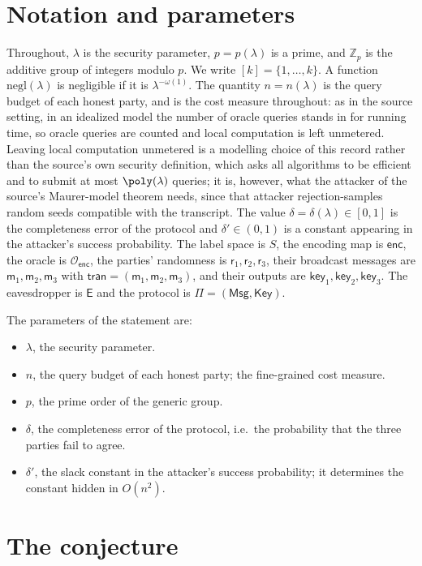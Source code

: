 \documentclass{conjura-conjecture}
\newcommand{\Zp}{\mathbb{Z}_{p}}
\newcommand{\enc}{\mathsf{enc}}
\newcommand{\Oenc}{\mathcal{O}_{\enc}}
\newcommand{\Msg}{\mathsf{Msg}}
\newcommand{\Key}{\mathsf{Key}}
\newcommand{\tran}{\mathsf{tran}}
\newcommand{\keyv}{\mathsf{key}}
\newcommand{\rv}{\mathsf{r}}
\newcommand{\mv}{\mathsf{m}}
\newcommand{\Ev}{\mathsf{E}}
\newcommand{\negl}{\mathrm{negl}}
\begin{document}
\section{Notation and parameters}\label{sec:notation}

Throughout, $\lambda$ is the security parameter, $p = p(\lambda)$ is a
prime, and $\Zp$ is the additive group of integers modulo $p$. We write
$[k] = \{1,\dots,k\}$. A function $\negl(\lambda)$ is negligible if it
is $\lambda^{-\omega(1)}$. The quantity $n = n(\lambda)$ is the query
budget of each honest party, and is the cost measure throughout: as in
the source setting, in an idealized model the number of oracle queries
stands in for running time, so oracle queries are counted and local
computation is left unmetered. Leaving local computation unmetered is a
modelling choice of this record rather than the source's own security
definition, which asks all algorithms to be efficient and to submit at
most $\poly(\lambda)$ queries; it is, however, what the attacker of the
source's Maurer-model theorem needs, since that attacker
rejection-samples random seeds compatible with the transcript. The value
$\delta = \delta(\lambda) \in [0,1]$ is the completeness error of the
protocol and $\delta' \in (0,1)$ is a constant appearing in the
attacker's success probability. The label space is $S$, the encoding map
is $\enc$, the oracle is $\Oenc$, the parties' randomness is
$\rv_{1},\rv_{2},\rv_{3}$, their broadcast messages are
$\mv_{1},\mv_{2},\mv_{3}$ with $\tran = (\mv_{1},\mv_{2},\mv_{3})$, and
their outputs are $\keyv_{1},\keyv_{2},\keyv_{3}$. The eavesdropper is
$\Ev$ and the protocol is $\Pi = (\Msg,\Key)$.

The parameters of the statement are:
\begin{itemize}
\item $\lambda$, the security parameter.
\item $n$, the query budget of each honest party; the fine-grained cost
  measure.
\item $p$, the prime order of the generic group.
\item $\delta$, the completeness error of the protocol, i.e.\ the
  probability that the three parties fail to agree.
\item $\delta'$, the slack constant in the attacker's success
  probability; it determines the constant hidden in $O(n^{2})$.
\end{itemize}

\section{The conjecture}\label{sec:conjectures}
\end{document}
